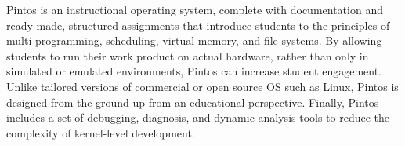 Pintos is an instructional operating system, complete with documentation
and ready-made, structured assignments that introduce students to the 
principles of multi-programming, scheduling, virtual memory, and file systems.
By allowing students to run their work product on actual hardware,
rather than only in simulated or emulated environments, Pintos can
increase student engagement.  Unlike tailored versions of commercial
or open source OS such as Linux, Pintos is designed from the ground up
from an educational perspective.  Finally, Pintos includes a set of
debugging, diagnosis, and dynamic analysis tools to reduce the complexity
of kernel-level development.
